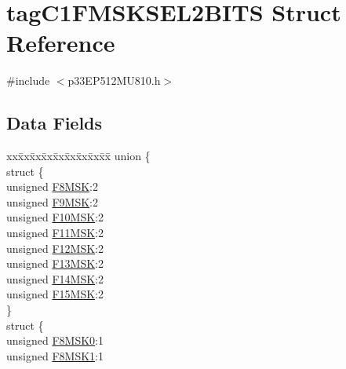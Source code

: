 \hypertarget{structtag_c1_f_m_s_k_s_e_l2_b_i_t_s}{}\section{tag\+C1\+F\+M\+S\+K\+S\+E\+L2\+B\+I\+TS Struct Reference}
\label{structtag_c1_f_m_s_k_s_e_l2_b_i_t_s}


{\ttfamily \#include $<$p33\+E\+P512\+M\+U810.\+h$>$}

\subsection*{Data Fields}
\begin{DoxyCompactItemize}
\item 
\begin{tabbing}
xx\=xx\=xx\=xx\=xx\=xx\=xx\=xx\=xx\=\kill
union \{\\
\>struct \{\\
\>\>unsigned \hyperlink{structtag_c1_f_m_s_k_s_e_l2_b_i_t_s_aa385ebcf1c8887c3e813c9394311e258}{F8MSK}:2\\
\>\>unsigned \hyperlink{structtag_c1_f_m_s_k_s_e_l2_b_i_t_s_acd8b308dcee4c6a8ed0b741d9c8885a6}{F9MSK}:2\\
\>\>unsigned \hyperlink{structtag_c1_f_m_s_k_s_e_l2_b_i_t_s_ac85d207fdb98bcc241aef184226ab69f}{F10MSK}:2\\
\>\>unsigned \hyperlink{structtag_c1_f_m_s_k_s_e_l2_b_i_t_s_a26ca4276523f92fbcf6d68dd671840a2}{F11MSK}:2\\
\>\>unsigned \hyperlink{structtag_c1_f_m_s_k_s_e_l2_b_i_t_s_a332d4c499e1dc1081b68491c6d3fb583}{F12MSK}:2\\
\>\>unsigned \hyperlink{structtag_c1_f_m_s_k_s_e_l2_b_i_t_s_a81818c6979fc8facecfa97b854f79cb4}{F13MSK}:2\\
\>\>unsigned \hyperlink{structtag_c1_f_m_s_k_s_e_l2_b_i_t_s_a156146a47054ef86b796752535b8720e}{F14MSK}:2\\
\>\>unsigned \hyperlink{structtag_c1_f_m_s_k_s_e_l2_b_i_t_s_a4ea2a06f2eab2449eea6dcd55cbecb84}{F15MSK}:2\\
\>\} \\
\>struct \{\\
\>\>unsigned \hyperlink{structtag_c1_f_m_s_k_s_e_l2_b_i_t_s_abaf758e2c2d3d535fe7fd6263a36e965}{F8MSK0}:1\\
\>\>unsigned \hyperlink{structtag_c1_f_m_s_k_s_e_l2_b_i_t_s_a50105813baa614d18a472ba0fd6c1484}{F8MSK1}:1\\

\end{tabbing}
\end{DoxyCompactItemize}
